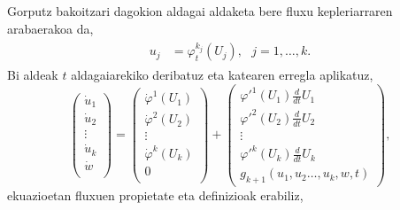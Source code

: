 Gorputz bakoitzari dagokion aldagai aldaketa bere fluxu kepleriarraren arabaerakoa da,
\begin{align}
\label{eq:aldfl2}
\begin{split}
u_j&= \varphi_t^{k_j}(U_j), \ \ \ j=1,\dots,k.
\end{split}
\end{align}
Bi aldeak $t$ aldagaiarekiko deribatuz eta katearen erregla aplikatuz,
\begin{equation*}
\left(\begin{array}{c}
                \dot{u}_1  \\
                \dot{u}_2  \\
                \vdots \\
                \dot{u}_k    \\
                \dot{w}      \\
\end{array}\right)=
\left(\begin{array}{c}
                \dot{\varphi}^1(U_1)  \\
                \dot{\varphi}^2(U_2)   \\
                \vdots \\
                \dot{\varphi}^k(U_k)   \\
                0      \\
\end{array}\right)+
\left(\begin{array}{c}
      \varphi'^1(U_1) \frac{d}{dt}U_1 \\
      \varphi'^2(U_2) \frac{d}{dt}U_2 \\
                \vdots \\
     \varphi'^k(U_k) \frac{d}{dt}U_k\\
      g_{k+1}(u_1, u_2\dots, u_k,w,t)
\end{array}\right),
\end{equation*}
ekuazioetan fluxuen propietate eta definizioak erabiliz,
